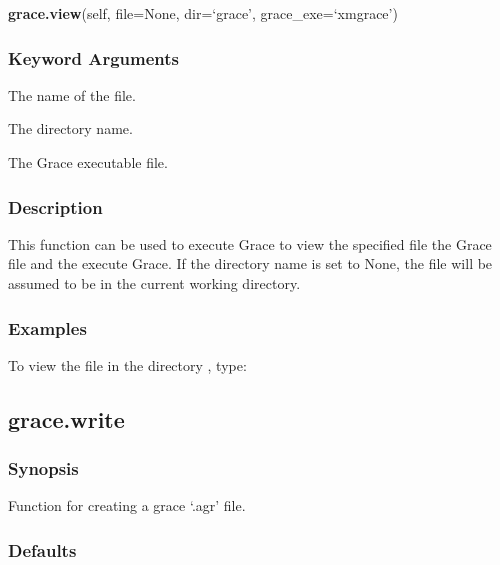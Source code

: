 \textsf{\textbf{grace.view}(self, file=None, dir=`grace', grace\_exe=`xmgrace')}


\subsubsection{Keyword Arguments}


  The name of the file.

  The directory name.

  The Grace  executable file.

\subsubsection{Description}

This function can be used to execute Grace  to view the specified file the Grace  
 file
and the execute Grace.  If the directory name is set to None, the file will be assumed to be
in the current working directory.


\subsubsection{Examples}

To view the file 
 in the directory 
, type:





\newpage

\subsection{grace.write}


\subsubsection{Synopsis}

Function for creating a grace `.agr' file.

\subsubsection{Defaults}

